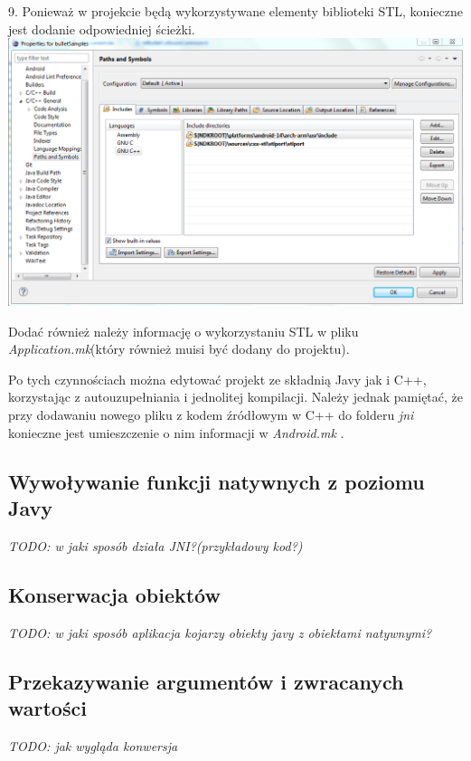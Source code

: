   9. Ponieważ w projekcie będą wykorzystywane elementy biblioteki STL,
  konieczne jest dodanie odpowiedniej ścieżki.\\
  
  \includegraphics[width=\textwidth]{./img/ndkroot.png}
  
  Dodać również należy informację o wykorzystaniu STL w pliku
  \emph{Application.mk}(który również muisi być dodany do projektu).
  
  
  
  Po tych czynnościach można edytować projekt ze składnią Javy jak i C++,
  korzystając z autouzupełniania i jednolitej kompilacji. Należy jednak
  pamiętać, że przy dodawaniu nowego pliku z kodem źródłowym w C++ do folderu
  \emph{jni} konieczne jest umieszczenie o nim informacji w \emph{Android.mk} .

\subsection{Wywoływanie funkcji natywnych z poziomu Javy}
\emph{TODO: w jaki sposób działa JNI?(przykładowy kod?)}

\subsection{Konserwacja obiektów}
\emph{TODO: w jaki sposób aplikacja kojarzy obiekty javy z obiektami natywnymi?}

\subsection{Przekazywanie argumentów i zwracanych wartości}
\emph{TODO: jak wygląda konwersja }

